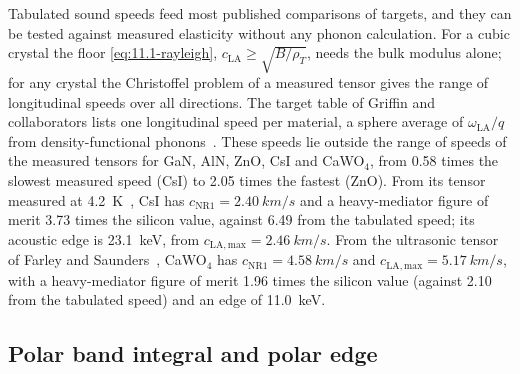 Tabulated sound speeds feed most published comparisons of targets, and they can be tested against measured elasticity without any phonon calculation. For a cubic crystal the floor \cref{eq:11.1-rayleigh}, $c_{\mathrm{LA}} \ge \sqrt{B/\rho_T}$, needs the bulk modulus alone; for any crystal the Christoffel problem of a measured tensor gives the range of longitudinal speeds over all directions. The target table of Griffin and collaborators lists one longitudinal speed per material, a sphere average of $\omega_{\mathrm{LA}}/q$ from density-functional phonons~\cite[Table~I and App.~A\,3]{griffin2020multichannel}. These speeds lie outside the range of speeds of the measured tensors for GaN, AlN, ZnO, CsI and CaWO$_4$, from 0.58 times the slowest measured speed (CsI) to 2.05 times the fastest (ZnO). From its tensor measured at \SI{4.2}{K}~\cite{vallin1964elastic}, CsI has $c_{\mathrm{NR1}} = \SI{2.40}{km/s}$ and a heavy-mediator figure of merit 3.73 times the silicon value, against 6.49 from the tabulated speed; its acoustic edge is \SI{23.1}{keV}, from $c_{\mathrm{LA,max}} = \SI{2.46}{km/s}$. From the ultrasonic tensor of Farley and Saunders~\cite{farley1972ultrasonic}, CaWO$_4$ has $c_{\mathrm{NR1}} = \SI{4.58}{km/s}$ and $c_{\mathrm{LA,max}} = \SI{5.17}{km/s}$, with a heavy-mediator figure of merit 1.96 times the silicon value (against 2.10 from the tabulated speed) and an edge of \SI{11.0}{keV}.

\subsection{Polar band integral and polar edge}\label{sec:17.5-polar}

